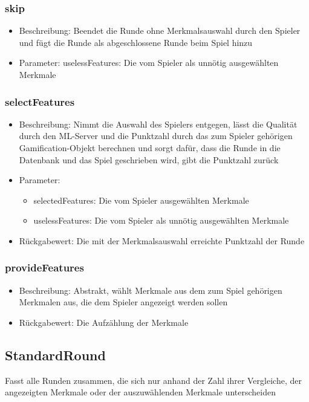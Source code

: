 \documentclass[a4paper]{scrreprt}
\begin{document}
	\subsubsection{skip}
	\begin{itemize}
		\item Beschreibung: Beendet die Runde ohne Merkmalsauswahl durch den Spieler und fügt die Runde als abgeschlossene Runde beim Spiel hinzu
		\item Parameter: uselessFeatures: Die vom Spieler als unnötig ausgewählten Merkmale
	\end{itemize}
	\subsubsection{selectFeatures}
	\begin{itemize}
		\item Beschreibung: Nimmt die Auswahl des Spielers entgegen, lässt die Qualität durch den ML-Server und die Punktzahl durch das zum Spieler gehörigen Gamification-Objekt berechnen und sorgt dafür, dass die Runde in die Datenbank und das Spiel geschrieben wird, gibt die Punktzahl zurück
		\item Parameter:
		\begin{itemize}
			\item selectedFeatures: Die vom Spieler ausgewählten Merkmale
			\item uselessFeatures: Die vom Spieler als unnötig ausgewählten Merkmale
		\end{itemize}
		\item Rückgabewert: Die mit der Merkmalsauswahl erreichte Punktzahl der Runde
	\end{itemize}
	\subsubsection{provideFeatures}
	\begin{itemize}
		\item Beschreibung: Abstrakt, wählt Merkmale aus dem zum Spiel gehörigen Merkmalen aus, die dem Spieler angezeigt werden sollen
		\item Rückgabewert: Die Aufzählung der Merkmale
	\end{itemize}

	\subsection{StandardRound}
	Fasst alle Runden zusammen, die sich nur anhand der Zahl ihrer Vergleiche, der angezeigten Merkmale oder der auszuwählenden Merkmale unterscheiden
\end{document}
